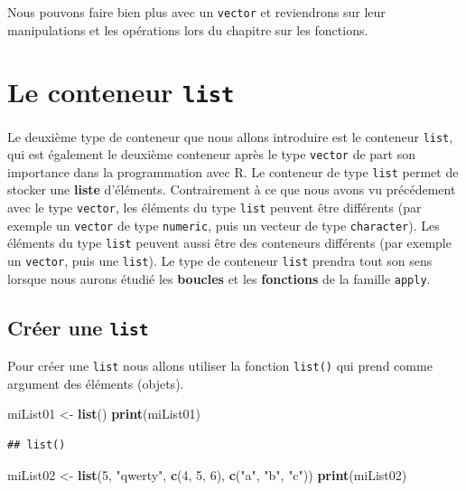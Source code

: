 \documentclass[]{book}
\newenvironment{Shaded}{\begin{snugshade}}{\end{snugshade}}
\newcommand{\DecValTok}[1]{\textcolor[rgb]{0.00,0.00,0.81}{#1}}
\newcommand{\KeywordTok}[1]{\textcolor[rgb]{0.13,0.29,0.53}{\textbf{#1}}}
\newcommand{\NormalTok}[1]{#1}
\newcommand{\StringTok}[1]{\textcolor[rgb]{0.31,0.60,0.02}{#1}}
\begin{document}
Nous pouvons faire bien plus avec un \texttt{vector} et reviendrons sur leur manipulations et les opérations lors du chapitre sur les fonctions.

\hypertarget{l014list}{%
\section{\texorpdfstring{Le conteneur \texttt{list}}{Le conteneur list}}\label{l014list}}

Le deuxième type de conteneur que nous allons introduire est le conteneur \texttt{list}, qui est également le deuxième conteneur après le type \texttt{vector} de part son importance dans la programmation avec R. Le conteneur de type \texttt{list} permet de stocker une \textbf{liste} d'éléments. Contrairement à ce que nous avons vu précédement avec le type \texttt{vector}, les éléments du type \texttt{list} peuvent être différents (par exemple un \texttt{vector} de type \texttt{numeric}, puis un vecteur de type \texttt{character}). Les éléments du type \texttt{list} peuvent aussi être des conteneurs différents (par exemple un \texttt{vector}, puis une \texttt{list}). Le type de conteneur \texttt{list} prendra tout son sens lorsque nous aurons étudié les \textbf{boucles} et les \textbf{fonctions} de la famille \texttt{apply}.

\hypertarget{creer-une-list}{%
\subsection{\texorpdfstring{Créer une \texttt{list}}{Créer une list}}\label{creer-une-list}}

Pour créer une \texttt{list} nous allons utiliser la fonction \texttt{list()} qui prend comme argument des éléments (objets).

\begin{Shaded}
\begin{Highlighting}[]
\NormalTok{miList01 <-}\StringTok{ }\KeywordTok{list}\NormalTok{()}
\KeywordTok{print}\NormalTok{(miList01)}
\end{Highlighting}
\end{Shaded}

\begin{verbatim}
## list()
\end{verbatim}

\begin{Shaded}
\begin{Highlighting}[]
\NormalTok{miList02 <-}\StringTok{ }\KeywordTok{list}\NormalTok{(}\DecValTok{5}\NormalTok{, }\StringTok{"qwerty"}\NormalTok{, }\KeywordTok{c}\NormalTok{(}\DecValTok{4}\NormalTok{, }\DecValTok{5}\NormalTok{, }\DecValTok{6}\NormalTok{), }\KeywordTok{c}\NormalTok{(}\StringTok{"a"}\NormalTok{, }\StringTok{"b"}\NormalTok{, }\StringTok{"c"}\NormalTok{))}
\KeywordTok{print}\NormalTok{(miList02)}
\end{Highlighting}
\end{Shaded}
\end{document}
